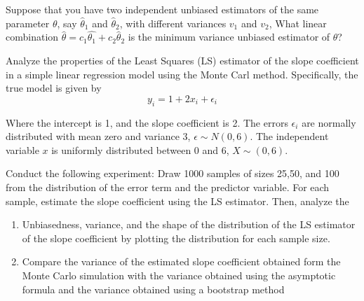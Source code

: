 \documentclass{article}
\begin{document}
Suppose that you have two independent unbiased estimators of the same parameter $\theta$, say 
$\hat{\theta}_1$ and $\hat{\theta}_2$, with different variances $v_1$ and $v_2$, What linear combination 
$\hat{\theta} = c_1\hat{\theta_1} + c_2\hat{\theta}_2$ is the minimum variance unbiased estimator of 
$\theta$?

Analyze the properties of the Least Squares (LS) estimator of the slope coefficient in a simple 
linear regression model using the Monte Carl method. Specifically, the true model is given by 
$$y_i = 1 + 2x_i + \epsilon_i$$

Where the intercept is 1, and the slope coefficient is 2. The errors $\epsilon_i$ are normally 
distributed with mean zero and variance 3, $\epsilon \sim N(0,6)$. The independent variable $x$
is uniformly distributed between 0 and 6, $X \sim (0,6)$.

Conduct the following experiment: Draw 1000 samples of sizes 25,50, and 100 from the 
distribution of the error term and the predictor variable. For each sample, estimate
the slope coefficient using the LS estimator. Then, analyze the 

\begin{enumerate}
  \item Unbiasedness, variance, and the shape of the distribution of the LS estimator of the slope 
    coefficient by plotting the distribution for each sample size. 
  \item Compare the variance of the estimated slope coefficient obtained form the Monte Carlo simulation with 
    the variance obtained using the asymptotic formula and the variance obtained using a bootstrap method 
\end{enumerate}
\end{document}

